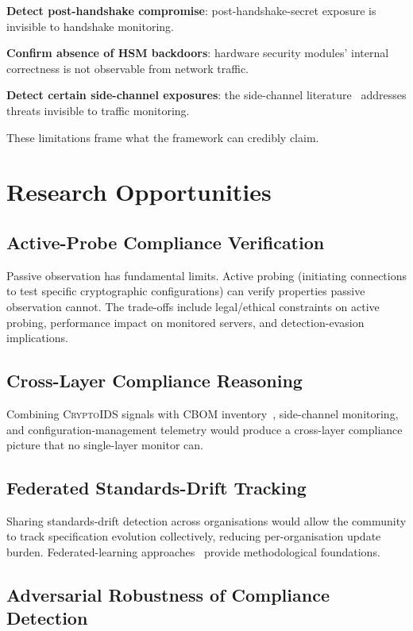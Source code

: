 \documentclass[sigconf,nonacm]{acmart}
\begin{document}
\textbf{Detect post-handshake compromise}: post-handshake-secret
exposure is invisible to handshake monitoring.

\textbf{Confirm absence of HSM backdoors}: hardware security
modules' internal correctness is not observable from network
traffic.

\textbf{Detect certain side-channel exposures}: the
side-channel literature~\cite{karayalcin2024kyber} addresses
threats invisible to traffic monitoring.

These limitations frame what the framework can credibly claim.

\section{Research Opportunities}

\subsection{Active-Probe Compliance Verification}

Passive observation has fundamental limits. Active probing
(initiating connections to test specific cryptographic
configurations) can verify properties passive observation
cannot. The trade-offs include legal/ethical constraints on
active probing, performance impact on monitored servers, and
detection-evasion implications.

\subsection{Cross-Layer Compliance Reasoning}

Combining \textsc{CryptoIDS} signals with CBOM
inventory~\cite{cyclonedx2024crypto}, side-channel monitoring,
and configuration-management telemetry would produce a
cross-layer compliance picture that no single-layer monitor can.

\subsection{Federated Standards-Drift Tracking}

Sharing standards-drift detection across organisations would
allow the community to track specification evolution
collectively, reducing per-organisation update burden.
Federated-learning approaches~\cite{kairouz2021advances} provide
methodological foundations.

\subsection{Adversarial Robustness of Compliance Detection}
\end{document}
